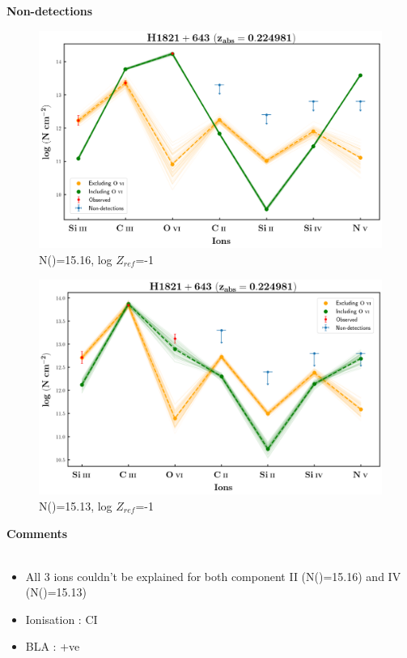 \documentclass[12pt,draft]{report}
\newcommand\ion[2]{\text{#1\,\textsc{\lowercase{#2}}}}
\begin{document}
\newpage

\textbf{Non-detections}

\begin{figure}[!h]
    \centering
    \includegraphics[width=0.8\linewidth]{Ionisation-Modelling-Plots/h1821-z=0.224981-compII_logZ=-1_non_detection.png}
    \caption{N(\ion{H}{i})=15.16, log $Z_{ref}$=-1}
\end{figure}

\begin{figure}[!h]
    \centering
    \includegraphics[width=0.8\linewidth]{Ionisation-Modelling-Plots/h1821-z=0.224981-compIV_logZ=-1_non_detection.png}
    \caption{N(\ion{H}{i})=15.13, log $Z_{ref}$=-1}
\end{figure}




\newpage

\textbf{Comments}
\\\\
\begin{itemize}
    \item All 3 ions couldn't be explained for both component II (N(\ion{H}{i})=15.16) and IV (N(\ion{H}{i})=15.13)
    \item Ionisation : CI
    \item BLA : +ve
\end{itemize}
\end{document}
